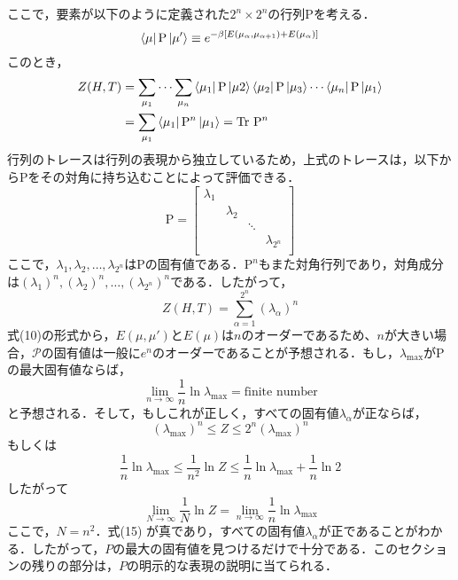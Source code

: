 \documentclass[a4paper,11pt]{jsarticle}
\begin{document}
ここで，要素が以下のように定義された$2^n \times 2^n$の行列$\mathrm{P}$を考える．
\begin{equation}
  \bra{\mu} \mathrm{P} \ket{\mu'} \equiv e^{-\beta [E(\mu_{\alpha}, \mu_{\alpha+1}) + E(\mu_{\alpha})]}
\end{equation}
このとき，
\begin{align}
  Z(H,T)
  &= \sum_{\mu_1} \cdots \sum_{\mu_n} \bra{\mu_1} \mathrm{P} \ket{\mu2}\bra{\mu_2} \mathrm{P} \ket{\mu_3}\cdots\bra{\mu_n} \mathrm{P} \ket{\mu_1} \\
  &= \sum_{\mu_1}\bra{\mu_1} \mathrm{P}^n \ket{\mu_1} = \mathrm{Tr} \ \mathrm{P}^n
\end{align}
行列のトレースは行列の表現から独立しているため，上式のトレースは，以下から$\mathrm{P}$をその対角に持ち込むことによって評価できる．
\begin{equation}
  \mathrm{P} = \begin{bmatrix}
    \lambda_1 & & & \\
     & \lambda_2 & & \\
     & & \ddots & \\
     & & & \lambda_{2^n} \\
  \end{bmatrix}
\end{equation}
ここで，$\lambda_1, \lambda_2, \dots, \lambda_{2^n}$は$\mathrm{P}$の固有値である．$\mathrm{P}^n$もまた対角行列であり，対角成分は$(\lambda_1)^n, (\lambda_2)^n, \dots, (\lambda_{2^n})^n$である．したがって，
\begin{equation}
  Z(H,T)
  = \sum_{\alpha=1}^{2^n} (\lambda_\alpha)^n
\end{equation}
式(10)の形式から，$E(\mu, \mu')$と$E(\mu)$は$n$のオーダーであるため、$n$が大きい場合，$\mathcal{P}$の固有値は一般に$e^n$のオーダーであることが予想される．もし，$\lambda_{\text{max}}$が$\mathrm{P}$の最大固有値ならば，
\begin{equation}
  \lim_{n \rightarrow \infty} \frac{1}{n} \ln{\lambda}_{\text{max}}
  = \text{finite number}
\end{equation}
と予想される．そして，もしこれが正しく，すべての固有値$\lambda_{\alpha}$が正ならば，
\begin{equation}
  (\lambda_{\text{max}})^n \leq Z \leq 2^n (\lambda_{\max})^n
\end{equation}
もしくは
\begin{equation}
  \frac{1}{n}\ln{\lambda_{\text{max}}}
  \leq \frac{1}{n^2}\ln{Z}
  \leq \frac{1}{n}\ln{\lambda_{\text{max}}} + \frac{1}{n} \ln{2}
\end{equation}
したがって
\begin{equation}
  \lim_{N \rightarrow \infty} \frac{1}{N} \ln{Z}
  = \lim_{n \rightarrow \infty} \frac{1}{n} \ln{\lambda_{\text{max}}}
\end{equation}
ここで，$N=n^2$．式(15) が真であり，すべての固有値$\lambda_{\alpha}$が正であることがわかる．したがって，$P$の最大の固有値を見つけるだけで十分である．このセクションの残りの部分は，$P$の明示的な表現の説明に当てられる．\par
\end{document}
